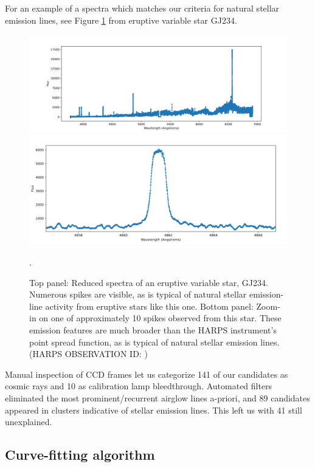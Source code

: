 \documentclass[linenumbers]{aastex631}
\begin{document}
For an example of a spectra which matches our criteria for natural stellar emission lines, see Figure \ref{fig:eruptivevariablestar}  from eruptive variable star GJ234.

\begin{figure}
    \centering
    \includegraphics[width=\textwidth]{eruptive_variable_star_reduced_spectrum-1.png}
    \includegraphics[width=\textwidth]{eruptivevariablestarbroadpeak.png}
    \caption{Top panel: Reduced spectra of an eruptive variable star, GJ234. Numerous spikes are visible, as is typical of natural stellar emission-line activity from eruptive stars like this one.  Bottom panel: Zoom-in on one of approximately 10 spikes observed from this star. These emission features are much broader than the HARPS instrument's point spread function, as is typical of natural stellar emission lines. (HARPS OBSERVATION ID: )}.
    \label{fig:eruptivevariablestar}
\end{figure}

Manual inspection of CCD frames let us categorize 141 of our candidates as cosmic rays and 10 as calibration lamp bleedthrough. Automated filters eliminated the most prominent/recurrent airglow lines a-priori, and 89 candidates appeared in clusters indicative of stellar emission lines. This left us with 41 still unexplained.

\subsection{Curve-fitting algorithm}
\label{s:curvefit}
\end{document}
